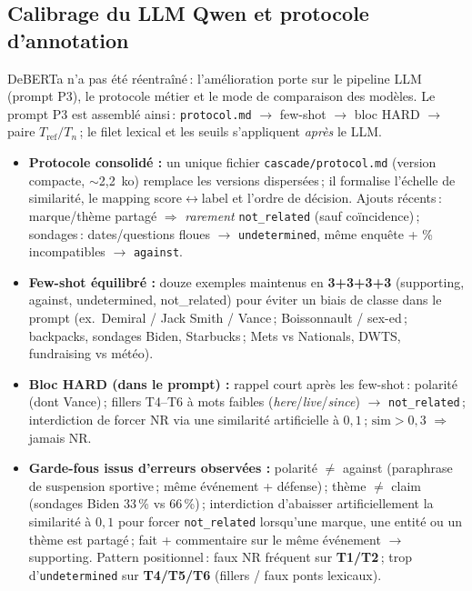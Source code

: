 \subsection*{Calibrage du LLM Qwen et protocole d'annotation}
DeBERTa n'a pas été réentraîné\,: l'amélioration porte sur le pipeline LLM (prompt P3), le protocole métier et le mode de comparaison des modèles.
Le prompt P3 est assemblé ainsi\,: \texttt{protocol.md} $\to$ few-shot $\to$ bloc HARD $\to$ paire $T_{\mathrm{ref}}/T_n$\,; le filet lexical et les seuils s'appliquent \emph{après} le LLM.

\begin{itemize}
    \item \textbf{Protocole consolidé :} un unique fichier \texttt{cascade/protocol.md} (version compacte, $\sim$2{,}2~ko) remplace les versions dispersées\,; il formalise l'échelle de similarité, le mapping score$\leftrightarrow$label et l'ordre de décision.
          Ajouts récents\,: marque/thème partagé $\Rightarrow$ \emph{rarement} \texttt{not\_related} (sauf coïncidence)\,; sondages\,: dates/questions floues $\to$ \texttt{undetermined}, même enquête + \% incompatibles $\to$ \texttt{against}.

    \item \textbf{Few-shot équilibré :} douze exemples maintenus en \textbf{3+3+3+3} (supporting, against, undetermined, not\_related) pour éviter un biais de classe dans le prompt (ex.\ Demiral / Jack Smith / Vance\,; Boissonnault / sex-ed\,; backpacks, sondages Biden, Starbucks\,; Mets vs Nationals, DWTS, fundraising vs météo).

    \item \textbf{Bloc HARD (dans le prompt) :} rappel court après les few-shot\,: polarité (dont Vance)\,; fillers T4--T6 à mots faibles (\emph{here}/\emph{live}/\emph{since}) $\to$ \texttt{not\_related}\,; interdiction de forcer NR via une similarité artificielle à $0{,}1$\,; $\mathrm{sim}>0{,}3$ $\Rightarrow$ jamais NR.

    \item \textbf{Garde-fous issus d'erreurs observées :} polarité $\neq$ against (paraphrase de suspension sportive\,; même événement + défense)\,; thème $\neq$ claim (sondages Biden 33\,\% vs 66\,\%)\,; interdiction d'abaisser artificiellement la similarité à $0{,}1$ pour forcer \texttt{not\_related} lorsqu'une marque, une entité ou un thème est partagé\,; fait + commentaire sur le même événement $\to$ supporting.
          Pattern positionnel\,: faux NR fréquent sur \textbf{T1/T2}\,; trop d'\texttt{undetermined} sur \textbf{T4/T5/T6} (fillers / faux ponts lexicaux).


\end{itemize}

